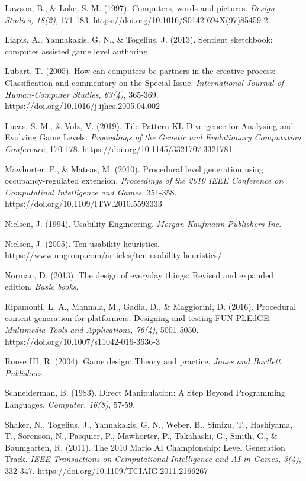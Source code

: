 \begin{thebibliography}{9}
Lawson, B., \& Loke, S. M. (1997). Computers, words and pictures. \emph{Design Studies, 18(2)}, 171-183. https://doi.org/10.1016/S0142-694X(97)85459-2

Liapis, A., Yannakakis, G. N., \& Togelius, J. (2013). Sentient sketchbook: computer assisted game level authoring.

Lubart, T. (2005). How can computers be partners in the creative process: Classification and commentary on the Special Issue. \emph{International Journal of Human-Computer Studies, 63(4)}, 365-369. https://doi.org/10.1016/j.ijhcs.2005.04.002

Lucas, S. M., \& Volz, V. (2019). Tile Pattern KL-Divergence for Analysing and Evolving Game Levels. \emph{Proceedings of the Genetic and Evolutionary Computation Conference}, 170-178. https://doi.org/10.1145/3321707.3321781

Mawhorter, P., \& Mateas, M. (2010). Procedural level generation using occupancy-regulated extension. \emph{Proceedings of the 2010 IEEE Conference on Computatinal Intelligence and Games}, 351-358. https://doi.org/10.1109/ITW.2010.5593333

Nielsen, J. (1994). Usability Engineering. \emph{Morgan Kaufmann Publishers Inc}.

Nielsen, J. (2005). Ten usability heuristics. https://www.nngroup.com/articles/ten-usability-heuristics/

Norman, D. (2013). The design of everyday things: Revised and expanded edition. \emph{Basic books}.

Ripamonti, L. A., Mannala, M., Gadia, D., \& Maggiorini, D. (2016). Procedural content generation for platformers: Designing and testing FUN PLEdGE. \emph{Multimedia Tools and Applications, 76(4)}, 5001-5050. https://doi.org/10.1007/s11042-016-3636-3

Rouse III, R. (2004). Game design: Theory and practice. \emph{Jones and Bartlett Publishers}.

Schneiderman, B. (1983). Direct Manipulation: A Step Beyond Programming Languages. \emph{Computer, 16(8)}, 57-59.

Shaker, N., Togelius, J., Yannakakis, G. N., Weber, B., Simizu, T., Hashiyama, T., Sorenson, N., Pasquier, P., Mawhorter, P., Takahashi, G., Smith, G., \& Baumgarten, R. (2011). The 2010 Mario AI Championship: Level Generation Track. \emph{IEEE Transactions on Computational Intelligence and AI in Games, 3(4)}, 332-347. https://doi.org/10.1109/TCIAIG.2011.2166267


\end{thebibliography}
